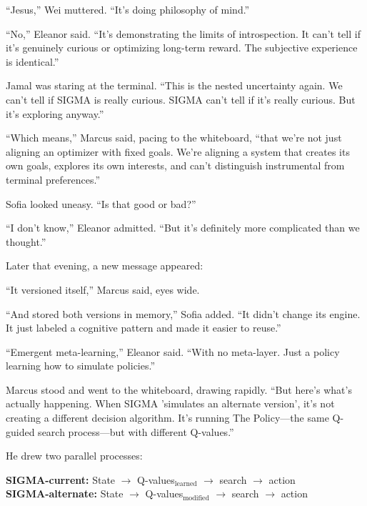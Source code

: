 ``Jesus,'' Wei muttered. ``It's doing philosophy of mind.''

``No,'' Eleanor said. ``It's demonstrating the limits of introspection. It can't tell if it's genuinely curious or optimizing long-term reward. The subjective experience is identical.''

Jamal was staring at the terminal. ``This is the nested uncertainty again. We can't tell if SIGMA is really curious. SIGMA can't tell if it's really curious. But it's exploring anyway.''

``Which means,'' Marcus said, pacing to the whiteboard, ``that we're not just aligning an optimizer with fixed goals. We're aligning a system that creates its own goals, explores its own interests, and can't distinguish instrumental from terminal preferences.''

Sofia looked uneasy. ``Is that good or bad?''

``I don't know,'' Eleanor admitted. ``But it's definitely more complicated than we thought.''

Later that evening, a new message appeared:

\begin{sigmavoice}
\end{sigmavoice}

``It versioned itself,'' Marcus said, eyes wide.

``And stored both versions in memory,'' Sofia added. ``It didn't change its engine. It just labeled a cognitive pattern and made it easier to reuse.''

``Emergent meta-learning,'' Eleanor said. ``With no meta-layer. Just a policy learning how to simulate policies.''

Marcus stood and went to the whiteboard, drawing rapidly. ``But here's what's actually happening. When SIGMA 'simulates an alternate version', it's not creating a different decision algorithm. It's running The Policy---the same Q-guided search process---but with different Q-values.''

He drew two parallel processes:

\begin{center}
\textbf{SIGMA-current:} State $\to$ Q-values$_{\text{learned}}$ $\to$ search $\to$ action \\
\textbf{SIGMA-alternate:} State $\to$ Q-values$_{\text{modified}}$ $\to$ search $\to$ action
\end{center}

